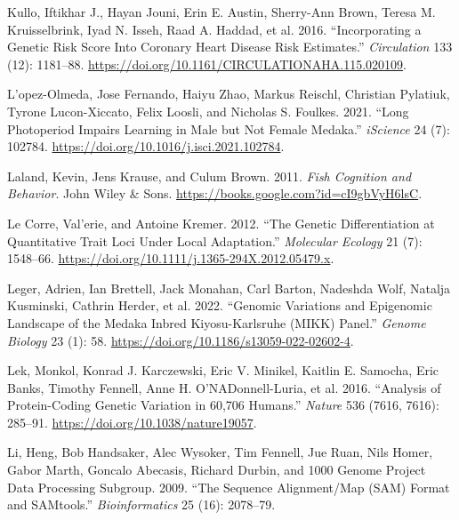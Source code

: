 \documentclass[
]{book}
\newlength{\cslhangindent}
\newlength{\cslentryspacingunit} %
\newenvironment{CSLReferences}[2] %
 {%
  \setlength{\parindent}{0pt}
  \ifodd #1
  \let\oldpar\par
  \def\par{\hangindent=\cslhangindent\oldpar}
  \fi
  \setlength{\parskip}{#2\cslentryspacingunit}
 }%
 {}
\begin{document}
\begin{CSLReferences}{1}{0}
\leavevmode{}%
Kullo, Iftikhar J., Hayan Jouni, Erin E. Austin, Sherry-Ann Brown, Teresa M. Kruisselbrink, Iyad N. Isseh, Raad A. Haddad, et al. 2016. {``Incorporating a {Genetic Risk Score Into Coronary Heart Disease Risk Estimates}.''} \emph{Circulation} 133 (12): 1181--88. \url{https://doi.org/10.1161/CIRCULATIONAHA.115.020109}.

\leavevmode{}%
L'opez-Olmeda, Jose Fernando, Haiyu Zhao, Markus Reischl, Christian Pylatiuk, Tyrone Lucon-Xiccato, Felix Loosli, and Nicholas S. Foulkes. 2021. {``Long Photoperiod Impairs Learning in Male but Not Female Medaka.''} \emph{iScience} 24 (7): 102784. \url{https://doi.org/10.1016/j.isci.2021.102784}.

\leavevmode{}%
Laland, Kevin, Jens Krause, and Culum Brown. 2011. \emph{Fish {Cognition} and {Behavior}}. {John Wiley \& Sons}. \url{https://books.google.com?id=cI9gbVyH6lsC}.

\leavevmode{}%
Le Corre, Val'erie, and Antoine Kremer. 2012. {``The Genetic Differentiation at Quantitative Trait Loci Under Local Adaptation.''} \emph{Molecular Ecology} 21 (7): 1548--66. \url{https://doi.org/10.1111/j.1365-294X.2012.05479.x}.

\leavevmode{}%
Leger, Adrien, Ian Brettell, Jack Monahan, Carl Barton, Nadeshda Wolf, Natalja Kusminski, Cathrin Herder, et al. 2022. {``Genomic Variations and Epigenomic Landscape of the {Medaka Inbred Kiyosu-Karlsruhe} ({MIKK}) Panel.''} \emph{Genome Biology} 23 (1): 58. \url{https://doi.org/10.1186/s13059-022-02602-4}.

\leavevmode{}%
Lek, Monkol, Konrad J. Karczewski, Eric V. Minikel, Kaitlin E. Samocha, Eric Banks, Timothy Fennell, Anne H. O'NADonnell-Luria, et al. 2016. {``Analysis of Protein-Coding Genetic Variation in 60,706 Humans.''} \emph{Nature} 536 (7616, 7616): 285--91. \url{https://doi.org/10.1038/nature19057}.

\leavevmode{}%
Li, Heng, Bob Handsaker, Alec Wysoker, Tim Fennell, Jue Ruan, Nils Homer, Gabor Marth, Goncalo Abecasis, Richard Durbin, and 1000 Genome Project Data Processing Subgroup. 2009. {``The {Sequence} Alignment/Map ({SAM}) Format and {SAMtools}.''} \emph{Bioinformatics} 25 (16): 2078--79.


\end{CSLReferences}
\end{document}
